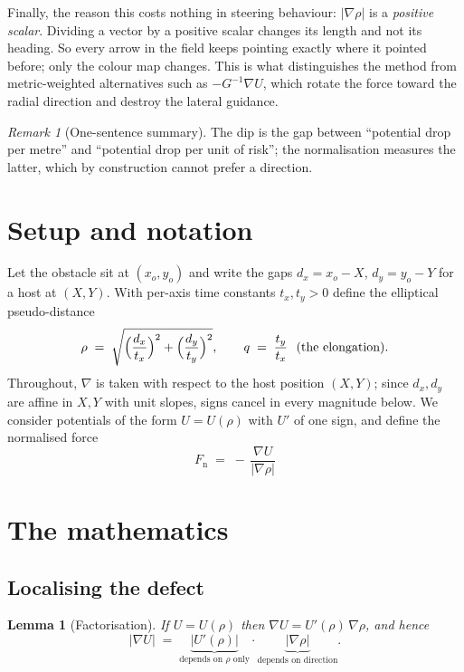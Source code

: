 \documentclass[11pt]{article}
\newtheorem{lemma}[theorem]{Lemma}
\theoremstyle{remark}
\newtheorem{remark}[theorem]{Remark}
\begin{document}
Finally, the reason this costs nothing in steering behaviour: $|\nabla\rho|$
is a \emph{positive scalar}. Dividing a vector by a positive scalar changes
its length and not its heading. So every arrow in the field keeps pointing
exactly where it pointed before; only the colour map changes. This is what
distinguishes the method from metric-weighted alternatives such as
$-G^{-1}\nabla U$, which rotate the force toward the radial direction and
destroy the lateral guidance.

\begin{remark}[One-sentence summary]
The dip is the gap between ``potential drop per metre'' and ``potential drop
per unit of risk''; the normalisation measures the latter, which by
construction cannot prefer a direction.
\end{remark}

\section{Setup and notation}

Let the obstacle sit at $(x_{o},y_{o})$ and write the gaps
$d_{x}=x_{o}-X$, $d_{y}=y_{o}-Y$ for a host at $(X,Y)$. With per-axis time
constants $t_{x},t_{y}>0$ define the elliptical pseudo-distance
\begin{equation}
  \rho \;=\; \sqrt{\Bigl(\frac{d_{x}}{t_{x}}\Bigr)^{2}
                 + \Bigl(\frac{d_{y}}{t_{y}}\Bigr)^{2}},
  \qquad
  q \;=\; \frac{t_{y}}{t_{x}}\ \ (\text{the elongation}).
  \label{eq:rho}
\end{equation}
Throughout, $\nabla$ is taken with respect to the host position $(X,Y)$;
since $d_{x},d_{y}$ are affine in $X,Y$ with unit slopes, signs cancel in
every magnitude below. We consider potentials of the form $U=U(\rho)$ with
$U'$ of one sign, and define the normalised force
\begin{equation}
  \boxed{\;F_{\mathrm{n}} \;=\; -\,\frac{\nabla U}{\bigl|\nabla\rho\bigr|}\;}
  \label{eq:Fn}
\end{equation}

\section{The mathematics}

\subsection{Localising the defect}

\begin{lemma}[Factorisation]
\label{lem:factor}
If $U=U(\rho)$ then $\nabla U = U'(\rho)\,\nabla\rho$, and hence
\begin{equation}
  \bigl|\nabla U\bigr|
  \;=\;
  \underbrace{\bigl|U'(\rho)\bigr|}_{\text{depends on }\rho\text{ only}}
  \cdot
  \underbrace{\bigl|\nabla\rho\bigr|}_{\text{depends on direction}} .
  \label{eq:factor}
\end{equation}
\end{lemma}
\end{document}
